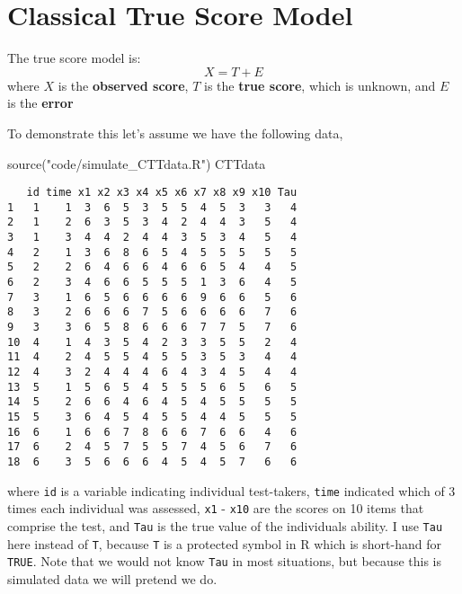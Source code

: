 \documentclass[
]{book}
\newenvironment{Shaded}{\begin{snugshade}}{\end{snugshade}}
\newcommand{\FunctionTok}[1]{\textcolor[rgb]{0.00,0.00,0.00}{#1}}
\newcommand{\NormalTok}[1]{#1}
\newcommand{\StringTok}[1]{\textcolor[rgb]{0.31,0.60,0.02}{#1}}
\begin{document}
\hypertarget{classical-true-score-model}{%
\section{Classical True Score Model}\label{classical-true-score-model}}

The true score model is:
\[
X = T + E
\]
where \(X\) is the \textbf{observed score}, \(T\) is the \textbf{true score}, which is unknown, and \(E\) is the \textbf{error}

To demonstrate this let's assume we have the following data,

\begin{Shaded}
\begin{Highlighting}[]
\FunctionTok{source}\NormalTok{(}\StringTok{"code/simulate\_CTTdata.R"}\NormalTok{)}
\NormalTok{CTTdata}
\end{Highlighting}
\end{Shaded}

\begin{verbatim}
   id time x1 x2 x3 x4 x5 x6 x7 x8 x9 x10 Tau
1   1    1  3  6  5  3  5  5  4  5  3   3   4
2   1    2  6  3  5  3  4  2  4  4  3   5   4
3   1    3  4  4  2  4  4  3  5  3  4   5   4
4   2    1  3  6  8  6  5  4  5  5  5   5   5
5   2    2  6  4  6  6  4  6  6  5  4   4   5
6   2    3  4  6  6  5  5  5  1  3  6   4   5
7   3    1  6  5  6  6  6  6  9  6  6   5   6
8   3    2  6  6  6  7  5  6  6  6  6   7   6
9   3    3  6  5  8  6  6  6  7  7  5   7   6
10  4    1  4  3  5  4  2  3  3  5  5   2   4
11  4    2  4  5  5  4  5  5  3  5  3   4   4
12  4    3  2  4  4  4  6  4  3  4  5   4   4
13  5    1  5  6  5  4  5  5  5  6  5   6   5
14  5    2  6  6  4  6  4  5  4  5  5   5   5
15  5    3  6  4  5  4  5  5  4  4  5   5   5
16  6    1  6  6  7  8  6  6  7  6  6   4   6
17  6    2  4  5  7  5  5  7  4  5  6   7   6
18  6    3  5  6  6  6  4  5  4  5  7   6   6
\end{verbatim}

where \texttt{id} is a variable indicating individual test-takers, \texttt{time} indicated which of 3 times each individual was assessed, \texttt{x1} - \texttt{x10} are the scores on 10 items that comprise the test, and \texttt{Tau} is the true value of the individuals ability.
I use \texttt{Tau} here instead of \texttt{T}, because \texttt{T} is a protected symbol in R which is short-hand for \texttt{TRUE}.
Note that we would not know \texttt{Tau} in most situations, but because this is simulated data we will pretend we do.
\end{document}
